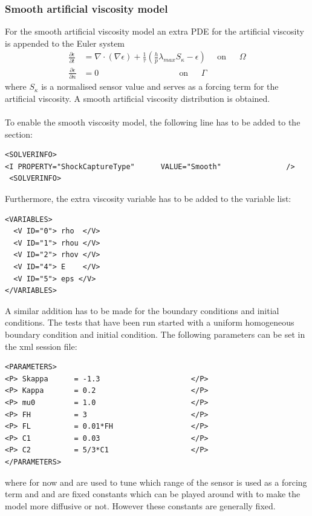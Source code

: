 \subsubsection{Smooth artificial viscosity model}
For the smooth artificial viscosity model an extra PDE for the artificial viscosity is appended to the Euler system
\begin{equation}\label{eq:eulerplusvis}\begin{split}
\frac{\partial \epsilon}{\partial t} &= \nabla\cdot \left(\nabla \epsilon\right) + \frac{1}{\tau}\left(\frac{h}{p}\lambda_{max}S_\kappa - \epsilon\right)\	\	\	\	\	\	\textrm{on}\	\	\	\	\	\	\	\Omega\\
\frac{\partial \epsilon}{\partial n} &= 0\	\	\	\	\	\	\	\	\	\	\	\	\	\	\	\	\	\	\	\	\	\	\	\	\	\	\	\	\	\	\	\	\	\	\	\	\	\	\	\	\	\	\	\textrm{on}\	\	\	\	\	\	\	\Gamma
\end{split}
\end{equation}
where $S_\kappa$ is a normalised sensor value and serves as a forcing term for the artificial viscosity. A smooth artificial viscosity distribution is obtained.\\
\\
To enable the smooth viscosity model, the following line has to be added to the  section:
\begin{lstlisting}[style=XmlStyle]
 <SOLVERINFO>
<I PROPERTY="ShockCaptureType"      VALUE="Smooth"               />
 <SOLVERINFO>
\end{lstlisting}
Furthermore, the extra viscosity variable  has to be added to the variable list:
\begin{lstlisting}[style=XmlStyle]        
<VARIABLES>
  <V ID="0"> rho  </V>
  <V ID="1"> rhou </V>
  <V ID="2"> rhov </V>
  <V ID="4"> E    </V>
  <V ID="5"> eps </V>
</VARIABLES>
\end{lstlisting}
A similar addition has to be made for the boundary conditions and initial conditions. The tests that have been run started with a uniform homogeneous boundary condition and initial condition.
The following parameters can be set in the xml session file:
\begin{lstlisting}[style=XmlStyle]
<PARAMETERS>
<P> Skappa 	 	= -1.3                     </P>
<P> Kappa 	 	= 0.2                      </P> 
<P> mu0 	 	= 1.0                      </P>
<P> FH 	 	 	= 3                        </P>
<P> FL 	 	 	= 0.01*FH                  </P>
<P> C1 	 	 	= 0.03                     </P>
<P> C2 		 	= 5/3*C1                   </P>
</PARAMETERS>
\end{lstlisting}
where for now  and  are used to tune which range of the sensor is used as a forcing term and  and  are fixed constants which can be played around with to make the model more diffusive or not. However these constants are generally fixed.
